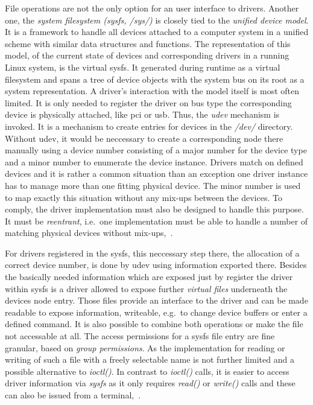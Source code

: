 File operations are not the only option for an user interface to drivers.
Another one, the \textit{system filesystem (sysfs, /sys/)} is closely tied to the \textit{unified device model}.
It is a framework to handle all devices attached to a computer system in a unified scheme with similar data structures and functions.
The representation of this model, of the current state of devices and corresponding drivers in a running Linux system, is the virtual sysfs.
It generated during runtime as a virtual filesystem and spans a tree of device objects with the system bus on its root as a system representation.
A driver's interaction with the model itself is most often limited.
It is only needed to register the driver on bus type the corresponding device is physically attached, like \ac{pci} or \ac{usb}.
Thus, the \textit{udev} mechanism is invoked.
It is a mechanism to create entries for devices in the \textit{/dev/} directory.
Without udev, it would be neccessary to create a corresponding node there manually using a device number consisting of a major number for the device type and a minor number to enumerate the device instance.
Drivers match on defined devices and it is rather a common situation than an exception one driver instance has to manage more than one fitting physical device.
The minor number is used to map exactly this situation without any mix-ups between the devices.
To comply, the driver implementation must also be designed to handle this purpose.
It must be \textit{reentrant}, i.e.\ one implementation must be able to handle a number of matching physical devices without mix-ups\cite{lfd430},~\cite{quade2016Linux}.

For drivers registered in the sysfs, this neccessary step there, the allocation of a correct device number, is done by udev using information exported there.
Besides the basically needed information which are exposed just by register the driver within sysfs is a driver allowed to expose further \textit{virtual files} underneath the devices node entry.
Those files provide an interface to the driver and can be made readable to expose information, writeable, e.g.\ to change device buffers or enter a defined command.
It is also possible to combine both operations or make the file not accessable at all.
The access permissions for a sysfs file entry are fine granular, based on \textit{group permissions}.
As the implementation for reading or writing of such a file with a freely selectable name is not further limited and a possible alternative to \textit{ioctl()}.
In contrast to \textit{ioctl()} calls, it is easier to access driver information via \textit{sysfs} as it only requires \textit{read()} or \textit{write()} calls and these can also be issued from a terminal\cite{lfd430},~\cite{quade2016Linux}.


